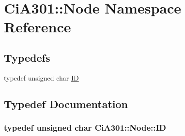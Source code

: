 \hypertarget{namespace_ci_a301_1_1_node}{}\section{Ci\+A301\+:\+:Node Namespace Reference}
\label{namespace_ci_a301_1_1_node}
\subsection*{Typedefs}
\begin{DoxyCompactItemize}
\item 
typedef unsigned char \hyperlink{namespace_ci_a301_1_1_node_a9c2ced538fec9de6165937ed18e8617b}{I\+D}
\end{DoxyCompactItemize}


\subsection{Typedef Documentation}
\hypertarget{namespace_ci_a301_1_1_node_a9c2ced538fec9de6165937ed18e8617b}{}
\subsubsection[{I\+D}]{\setlength{\rightskip}{0pt plus 5cm}typedef unsigned char {\bf Ci\+A301\+::\+Node\+::\+I\+D}}\label{namespace_ci_a301_1_1_node_a9c2ced538fec9de6165937ed18e8617b}
